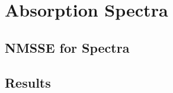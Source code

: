 \section{Absorption Spectra}
\label{sec:app.spectra}

\subsection{NMSSE for Spectra}
\label{sub:app.spectra.nmsse}

\subsection{Results}
\label{sub:app.spectra.results}
